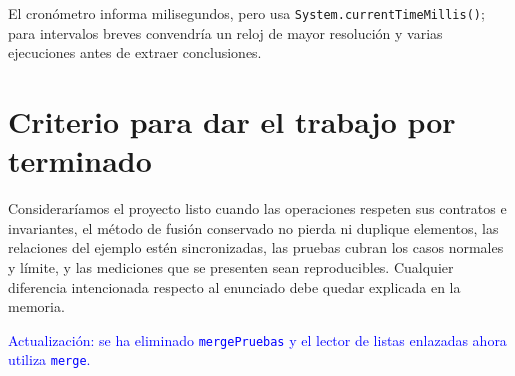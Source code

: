 \documentclass[a4paper,11pt]{report}
\begin{document}
El cronómetro informa milisegundos, pero usa \texttt{System.currentTimeMillis()}; para intervalos breves convendría un reloj de mayor resolución y varias ejecuciones antes de extraer conclusiones.

\section{Criterio para dar el trabajo por terminado}

Consideraríamos el proyecto listo cuando las operaciones respeten sus contratos e invariantes, el método de fusión conservado no pierda ni duplique elementos, las relaciones del ejemplo estén sincronizadas, las pruebas cubran los casos normales y límite, y las mediciones que se presenten sean reproducibles. Cualquier diferencia intencionada respecto al enunciado debe quedar explicada en la memoria.

\textcolor{blue}{Actualización: se ha eliminado \texttt{mergePruebas} y el lector de listas enlazadas ahora utiliza \texttt{merge}.}
\end{document}
